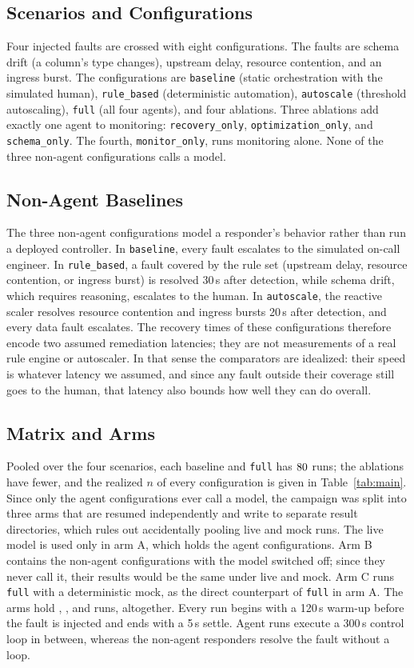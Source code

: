 \subsection{Scenarios and Configurations}
Four injected faults are crossed with eight configurations. The faults are schema drift (a column's
type changes), upstream delay, resource contention, and an ingress burst. The configurations are
\texttt{baseline} (static orchestration with the simulated human), \texttt{rule\_based}
(deterministic automation), \texttt{autoscale} (threshold autoscaling), \texttt{full} (all four
agents), and four ablations. Three ablations add exactly one agent to monitoring:
\texttt{recovery\_only}, \texttt{optimization\_only}, and \texttt{schema\_only}. The fourth,
\texttt{monitor\_only}, runs monitoring alone. None of the three non-agent configurations calls a
model.

\subsection{Non-Agent Baselines}
The three non-agent configurations model a responder's behavior rather than run a deployed
controller. In \texttt{baseline}, every fault escalates to the simulated on-call engineer. In
\texttt{rule\_based}, a fault covered by the rule set (upstream delay, resource contention, or ingress
burst) is resolved 30\,s after detection, while schema drift, which requires reasoning, escalates to
the human. In \texttt{autoscale}, the reactive scaler resolves resource contention and ingress bursts
20\,s after detection, and every data fault escalates. The recovery times of these configurations
therefore encode two assumed remediation latencies; they are not measurements of a real rule engine
or autoscaler. In that sense the comparators are idealized: their speed is whatever
latency we assumed, and since any fault outside their coverage still goes to the human, that latency
also bounds how well they can do overall.

\subsection{Matrix and Arms}
Pooled over the four scenarios, each baseline and \texttt{full} has $80{}$ runs; the
ablations have fewer, and the realized $n$ of every configuration is given in Table~\ref{tab:main}.
Since only the agent configurations ever call a model, the campaign was split into three arms that are
resumed independently and write to separate result directories, which rules out accidentally pooling
live and mock runs. The live model is used only in arm A, which holds the agent configurations. Arm B contains the non-agent
configurations with the model switched off; since they never call it, their results would be the
same under live and mock. Arm C runs \texttt{full} with a deterministic mock, as the direct
counterpart of \texttt{full} in arm A. The arms hold \NRunsArmA{}, \NRunsArmB{}, and \NRunsArmC{}
runs, \NRunsTotal{} altogether. Every run begins with a
120\,s warm-up before the fault is injected and ends with a 5\,s settle. Agent runs execute a 300\,s
control loop in between, whereas the non-agent responders resolve the fault without a loop.

